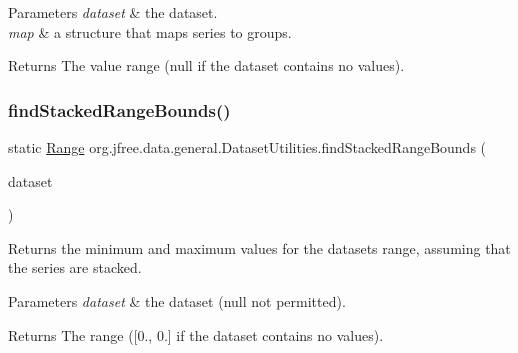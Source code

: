 \begin{DoxyParams}{Parameters}
{\em dataset} & the dataset. \\
\hline
{\em map} & a structure that maps series to groups.\\
\hline
\end{DoxyParams}
\begin{DoxyReturn}{Returns}
The value range ({\ttfamily null} if the dataset contains no values). 
\end{DoxyReturn}
\mbox{\label{classorg_1_1jfree_1_1data_1_1general_1_1_dataset_utilities_aad756864ae876364cbd7596ce0820ab6}} 
\subsubsection{\texorpdfstring{find\+Stacked\+Range\+Bounds()}{findStackedRangeBounds()}\hspace{0.1cm}{\footnotesize\ttfamily [4/5]}}
{\footnotesize\ttfamily static \mbox{\hyperlink{classorg_1_1jfree_1_1data_1_1_range}{Range}} org.\+jfree.\+data.\+general.\+Dataset\+Utilities.\+find\+Stacked\+Range\+Bounds (\begin{DoxyParamCaption}\item[{\mbox{\hyperlink{interfaceorg_1_1jfree_1_1data_1_1xy_1_1_table_x_y_dataset}{Table\+X\+Y\+Dataset}}}]{dataset }\end{DoxyParamCaption})\hspace{0.3cm}{\ttfamily [static]}}

Returns the minimum and maximum values for the dataset\textquotesingle{}s range, assuming that the series are stacked.


\begin{DoxyParams}{Parameters}
{\em dataset} & the dataset ({\ttfamily null} not permitted).\\
\hline
\end{DoxyParams}
\begin{DoxyReturn}{Returns}
The range (\mbox{[}0., 0.\mbox{]} if the dataset contains no values). 
\end{DoxyReturn}
\mbox{\label{classorg_1_1jfree_1_1data_1_1general_1_1_dataset_utilities_a9c477a5cdb456f23af14ac27d052d44e}} 
